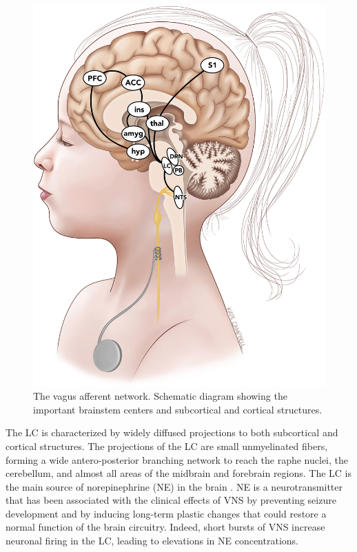   \begin{figure}[h]
    \begin{minipage}[c]{0.5\textwidth}
      \includegraphics[width=\textwidth]{images/vagus_afferent_network.jpg}
    \end{minipage}\hfill
    \begin{minipage}[c]{0.5\textwidth}
      \caption{The vagus afferent network. Schematic diagram showing the important brainstem centers and subcortical and cortical structures. \cite{campbell, HanchemWongIbrahim2018}} 
      \label{fig:Vagus Afferent Network}
    \end{minipage}
    \centering
  \end{figure}

  The LC is characterized by widely diffused projections to both subcortical and cortical structures. The projections of the LC are small unmyelinated fibers, forming a wide antero-posterior branching network to reach the raphe nuclei, the cerebellum, and almost all areas of the midbrain and forebrain regions. The LC is the main source of norepinephrine (NE) in the brain \cite{AGHAJANIAN1977570}. NE is a neurotransmitter that has been associated with the clinical effects of VNS by preventing seizure development and by inducing long-term plastic changes that could restore a normal function of the brain circuitry. Indeed, short bursts of VNS increase neuronal firing in the LC, leading to elevations in NE concentrations. \cite{BergerVespa2021}

